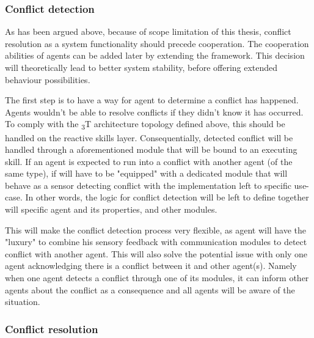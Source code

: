 \documentclass[main.tex]{subfiles}
\begin{document}
\subsubsection{Conflict detection}

As has been argued above, because of scope limitation of this thesis, 
conflict resolution as a system functionality should precede cooperation. The cooperation 
abilities of agents can be added later by extending the framework.
This decision will theoretically lead to better system stability, before offering extended
behaviour possibilities. 

The first step is to have a way for agent to determine a conflict has happened. Agents wouldn't be 
able to resolve conflicts if they didn't know it has occurred. To comply with the \textsubscript{3}T
architecture topology defined above, this should be handled on the reactive skills layer. 
Consequentially, detected conflict will be handled through a aforementioned module that will be bound 
to an executing skill. If an agent is expected to run into a conflict with another agent (of the same 
type), if will have to be "equipped" with a dedicated module that will behave as a sensor detecting conflict 
with the implementation left to specific use-case. In other words, the logic for conflict detection will be 
left to define together will specific agent and its properties, and other modules.

This will make the conflict detection process very flexible, as agent will have the "luxury" to combine
his sensory feedback with communication modules to detect conflict with another agent. This will also 
solve the potential issue with only one agent acknowledging there is a conflict between it and 
other agent(s). Namely when one agent detects a conflict through one of its modules, it can inform 
other agents about the conflict as a consequence and all agents will be aware of the situation. 


\subsubsection{Conflict resolution}
\end{document}
